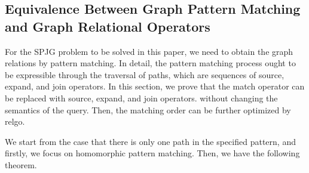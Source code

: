 \iffalse
\subsection{Equivalence Between Graph Pattern Matching and Graph Relational Operators}
\label{sec:proof-gpm-gro}

For the SPJG problem to be solved in this paper, we need to obtain the graph relations by pattern matching.
In detail, the pattern matching process ought to be expressible through the traversal of paths, which are sequences of source, expand, and join operators.
In this section, we prove that the match operator can be replaced with source, expand, and join operators. without changing the semantics of the query.
Then, the matching order can be further optimized by relgo.

We start from the case that there is only one path in the specified pattern, and firstly, we focus on homomorphic pattern matching.
Then, we have the following theorem.

